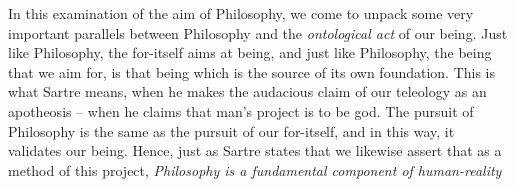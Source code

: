 In this examination of the aim of Philosophy, we come to unpack some very important parallels between Philosophy and the \emph{ontological act} of our being. Just like Philosophy, the for-itself aims at being, and just like Philosophy, the being that we aim for, is that being which is the source of its own foundation. This is what Sartre means, when he makes the audacious claim of our teleology as an apotheosis -- when he claims that man's project is to be god.  The pursuit of Philosophy is the same as the pursuit of our for-itself, and in this way, it validates our being. Hence, just as Sartre states that  we likewise assert that as a method of this project, \emph{Philosophy is a fundamental component of human-reality}

